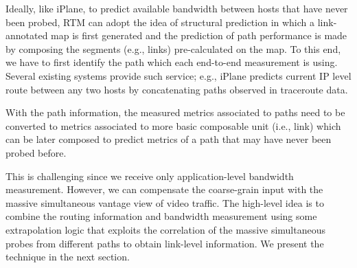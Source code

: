 Ideally, like iPlane, to predict available bandwidth between hosts that have never been probed, RTM can adopt the idea of structural prediction in which
a link-annotated map is first generated and the prediction of path performance
is made by composing the segments (e.g., links) pre-calculated on the map. To
this end, we have to first identify the path which each end-to-end measurement
is using. Several existing systems provide such service; e.g., 
iPlane predicts current IP level route between any two hosts by
concatenating paths observed in traceroute data. 

With the path information, the measured metrics
associated to paths need to be converted to metrics associated to more basic
composable unit (i.e., link) which can be later composed to predict metrics of
a path that may have never been probed before.

This is challenging since we receive only application-level bandwidth
measurement. However, we can compensate the coarse-grain input with the massive
simultaneous vantage view of video traffic. The high-level idea is to combine
the routing information and bandwidth measurement using some extrapolation logic
that exploits the correlation of the massive simultaneous probes from different
paths to obtain link-level information. We present the technique in the next section.
